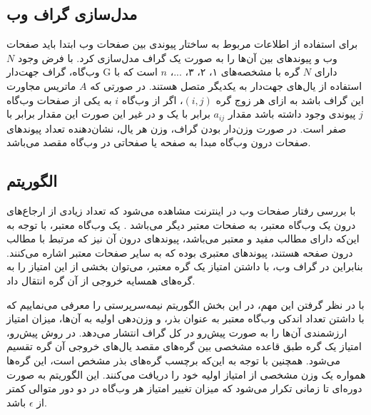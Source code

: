 \documentclass[twoside, a4paper,11pt]{book}
\numberwithin{equation}{chapter}
\numberwithin{table}{chapter}
\numberwithin{figure}{chapter}
\numberwithin{equation}{chapter}
\begin{document}
\subsection{مدل‌سازی گراف وب}
\label{section:linkbased-graphmodeling}  
برای استفاده از اطلاعات مربوط به ساختار پیوندی بین صفحات وب ابتدا باید صفحات وب و پیوندهای بین آن‌ها را به صورت یک گراف مدل‌سازی کرد. با فرض وجود $N$ وب‌گاه، گراف جهت‌دار G دارای $N$ گره با مشخصه‌های ۱، ۲، ۳، ...، $n$ است که با استفاده از یال‌های جهت‌دار به یکدیگر متصل هستند. در صورتی که $A$ ماتریس مجاورت این گراف باشد به ازای هر زوج گره $(i,j)$، اگر از وب‌گاه $i$ به یکی از صفحات وب‌گاه $j$ پیوندی وجود داشته باشد مقدار $a_{ij}$ برابر با یک و در غیر این صورت این مقدار برابر با صفر است. در صورت وزن‌دار بودن گراف، وزن هر یال، نشان‌دهنده تعداد پیوندهای صفحات درون وب‌گاه مبدا به صفحه یا صفحاتی در وب‌گاه مقصد می‌باشد.

\subsection{الگوریتم }
\label{section:linkbased-wp}
با بررسی رفتار صفحات وب در اینترنت مشاهده می‌شود که تعداد زیادی از ارجاع‌های درون یک وب‌گاه معتبر، به صفحات معتبر دیگر می‌باشد \cite{gyongyi2004combating}. یک وب‌گاه معتبر، با توجه به این‌که دارای مطالب مفید و معتبر می‌باشد، پیوندهای درون آن نیز که مرتبط با مطالب درون صفحه هستند، پیوندهای معتبری بوده که به سایر صفحات  معتبر اشاره می‌کنند. بنابراین در گراف وب، با داشتن امتیاز یک گره معتبر، می‌توان بخشی از این امتیاز را به گره‌های همسایه خروجی از آن گره انتقال داد.

با در نظر گرفتن این مهم، در این بخش الگوریتم نیمه‌سرپرستی را معرفی می‌نماییم که با داشتن تعداد اندکی وب‌گاه معتبر به عنوان بذر، و وزن‌دهی اولیه به آن‌ها، میزان امتیاز ارزشمندی آن‌ها را به صورت پیش‌رو در کل گراف انتشار می‌دهد. در روش پیش‌رو، امتیاز یک گره طبق قاعده مشخصی بین گره‌های مقصد یال‌های خروجی آن گره تقسیم می‌شود. 
همچنین با توجه به این‌که برچسب گره‌های بذر مشخص است، این گره‌ها همواره یک وزن مشخصی از امتیاز اولیه خود را دریافت می‌کنند. این الگوریتم به صورت دوره‌ای تا زمانی تکرار می‌شود که میزان تغییر امتیاز هر وب‌گاه‌ در دو دور متوالی کمتر از $\epsilon$ باشد. 
\end{document}
